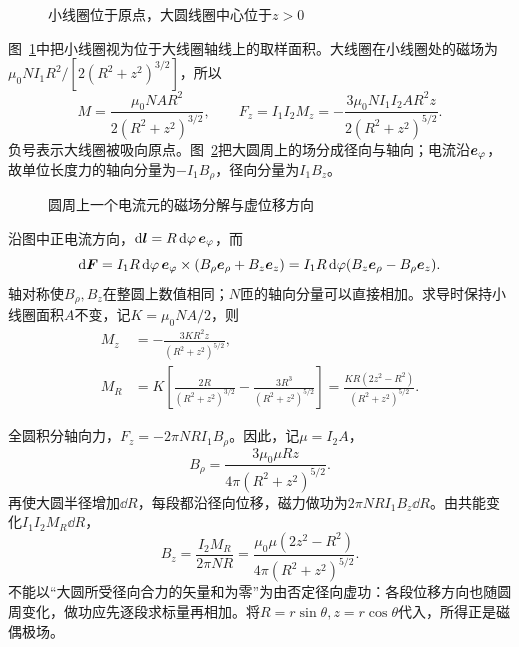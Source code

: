 \begin{figure}[H]\centering
{}
\caption{小线圈位于原点，大圆线圈中心位于$z>0$}\label{fig:i4-e1-q}
\end{figure}
\begin{solution}
图~\ref{fig:i4-e1-q}中把小线圈视为位于大线圈轴线上的取样面积。大线圈在小线圈处的磁场为$\mu_0NI_1R^2/[2(R^2+z^2)^{3/2}]$，所以
\[
M=\frac{\mu_0NAR^2}{2(R^2+z^2)^{3/2}},\qquad
F_z=I_1I_2M_z=-\frac{3\mu_0NI_1I_2AR^2z}{2(R^2+z^2)^{5/2}}.
\]
负号表示大线圈被吸向原点。图~\ref{fig:i4-e1-s}把大圆周上的场分成径向与轴向；电流沿$\bm{e}_\varphi$，故单位长度力的轴向分量为$-I_1B_\rho$，径向分量为$I_1B_z$。


\begin{figure}[H]\centering
{}
\caption{圆周上一个电流元的磁场分解与虚位移方向}\label{fig:i4-e1-s}
\end{figure}

沿图中正电流方向，$\mathop{}\!\mathrm d\bm{l}=R\mathop{}\!\mathrm d\varphi\,\bm{e}_\varphi$，而
\[
\mathop{}\!\mathrm d\bm{F}=I_1R\mathop{}\!\mathrm d\varphi\,\bm{e}_\varphi
\times(B_\rho\bm{e}_\rho+B_z\bm{e}_z)
=I_1R\mathop{}\!\mathrm d\varphi(B_z\bm{e}_\rho-B_\rho\bm{e}_z).
\]
轴对称使$B_\rho,B_z$在整圆上数值相同；$N$匝的轴向分量可以直接相加。求导时保持小线圈面积$A$不变，记$K=\mu_0NA/2$，则
\[
\begin{aligned}
M_z&=-\frac{3KR^2z}{(R^2+z^2)^{5/2}},\\
M_R&=K\left[\frac{2R}{(R^2+z^2)^{3/2}}
-\frac{3R^3}{(R^2+z^2)^{5/2}}\right]
=\frac{KR(2z^2-R^2)}{(R^2+z^2)^{5/2}}.
\end{aligned}
\]

全圆积分轴向力，$F_z=-2\pi NR I_1B_\rho$。因此，记$\mu=I_2A$，
\[
\boxed{B_\rho=\frac{3\mu_0\mu Rz}{4\pi(R^2+z^2)^{5/2}}}.
\]
再使大圆半径增加$\dd R$，每段都沿径向位移，磁力做功为$2\pi NRI_1B_z\dd R$。由共能变化$I_1I_2M_R\dd R$，
\[
B_z=\frac{I_2M_R}{2\pi NR}
=\boxed{\frac{\mu_0\mu(2z^2-R^2)}{4\pi(R^2+z^2)^{5/2}}}.
\]
不能以“大圆所受径向合力的矢量和为零”为由否定径向虚功：各段位移方向也随圆周变化，做功应先逐段求标量再相加。将$R=r\sin\theta,z=r\cos\theta$代入，所得正是磁偶极场。
\end{solution}

